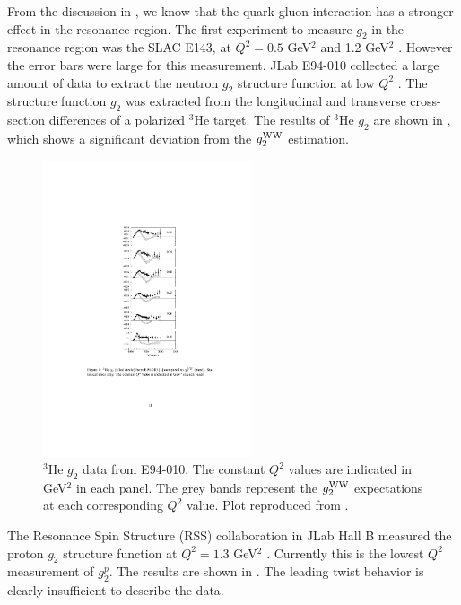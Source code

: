 From the discussion in , we know that the quark-gluon interaction has a stronger effect in the resonance region. The first experiment to measure $g_2$ in the resonance region was the SLAC E143, at $Q^2=0.5$ GeV${}^2$ and 1.2 GeV${}^2$ \cite{Abe1998}. However the error bars were large for this measurement. JLab E94-010 collected a large amount of data to extract the neutron $g_2$ structure function at low $Q^2$ \cite{Amarian2004a}. The structure function $g_2$ was extracted from the longitudinal and transverse cross-section differences of a polarized ${}^3$He target. The results of ${}^3$He $g_2$ are shown in , which shows a significant deviation from the $g_2^{\mathrm{WW}}$ estimation.

\begin{figure}[p!]
  \centering
  \includegraphics[width=0.55\textwidth]{figs/g2_E94010.pdf}
  \caption[${}^3$He $g_2$ data from E94-010.]{${}^3$He $g_2$ data from E94-010. The constant $Q^2$ values are indicated in GeV${}^2$ in each panel. The grey bands represent the $g_2^{\mathrm{WW}}$ expectations at each corresponding $Q^2$ value. Plot reproduced from \cite{Amarian2004a}. \label{C4S1F3}}
\end{figure}

The Resonance Spin Structure (RSS) collaboration in JLab Hall B measured the proton $g_2$ structure function at $Q^2=1.3$ GeV${}^2$ \cite{Wesselmann2007}. Currently this is the lowest $Q^2$ measurement of $g_2^p$. The results are shown in . The leading twist behavior is clearly insufficient to describe the data.

